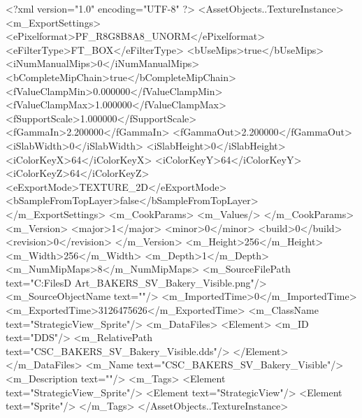 <?xml version="1.0" encoding="UTF-8" ?>
<AssetObjects..TextureInstance>
	<m_ExportSettings>
		<ePixelformat>PF_R8G8B8A8_UNORM</ePixelformat>
		<eFilterType>FT_BOX</eFilterType>
		<bUseMips>true</bUseMips>
		<iNumManualMips>0</iNumManualMips>
		<bCompleteMipChain>true</bCompleteMipChain>
		<fValueClampMin>0.000000</fValueClampMin>
		<fValueClampMax>1.000000</fValueClampMax>
		<fSupportScale>1.000000</fSupportScale>
		<fGammaIn>2.200000</fGammaIn>
		<fGammaOut>2.200000</fGammaOut>
		<iSlabWidth>0</iSlabWidth>
		<iSlabHeight>0</iSlabHeight>
		<iColorKeyX>64</iColorKeyX>
		<iColorKeyY>64</iColorKeyY>
		<iColorKeyZ>64</iColorKeyZ>
		<eExportMode>TEXTURE_2D</eExportMode>
		<bSampleFromTopLayer>false</bSampleFromTopLayer>
	</m_ExportSettings>
	<m_CookParams>
		<m_Values/>
	</m_CookParams>
	<m_Version>
		<major>1</major>
		<minor>0</minor>
		<build>0</build>
		<revision>0</revision>
	</m_Version>
	<m_Height>256</m_Height>
	<m_Width>256</m_Width>
	<m_Depth>1</m_Depth>
	<m_NumMipMaps>8</m_NumMipMaps>
	<m_SourceFilePath text="C:\Users\Shadow\Desktop\Working Files\2D Art\Quarters\Bakers\StrategicView\CSC_BAKERS_SV_Bakery_Visible.png"/>
	<m_SourceObjectName text=""/>
	<m_ImportedTime>0</m_ImportedTime>
	<m_ExportedTime>3126475626</m_ExportedTime>
	<m_ClassName text="StrategicView_Sprite"/>
	<m_DataFiles>
		<Element>
			<m_ID text="DDS"/>
			<m_RelativePath text="CSC_BAKERS_SV_Bakery_Visible.dds"/>
		</Element>
	</m_DataFiles>
	<m_Name text="CSC_BAKERS_SV_Bakery_Visible"/>
	<m_Description text=""/>
	<m_Tags>
		<Element text="StrategicView_Sprite"/>
		<Element text="StrategicView"/>
		<Element text="Sprite"/>
	</m_Tags>
</AssetObjects..TextureInstance>

